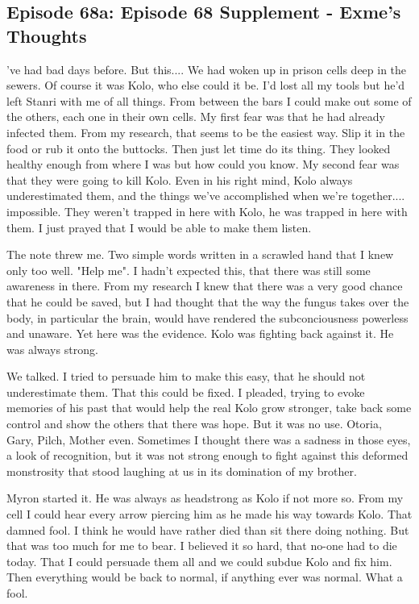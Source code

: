 \subsection{Episode 68a: Episode 68 Supplement - Exme's Thoughts}

've had bad days before. But this.... We had woken up in prison cells deep in the sewers. Of course it was Kolo, who else could it be. I'd lost all my tools but he'd left Stanri with me of all things. From between the bars I could make out some of the others, each one in their own cells. My first fear was that he had already infected them. From my research, that seems to be the easiest way. Slip it in the food or rub it onto the buttocks. Then just let time do its thing. They looked healthy enough from where I was but how could you know. My second fear was that they were going to kill Kolo. Even in his right mind, Kolo always underestimated them, and the things we've accomplished when we're together.... impossible. They weren't trapped in here with Kolo, he was trapped in here with them. I just prayed that I would be able to make them listen.\medskip

The note threw me. Two simple words written in a scrawled hand that I knew only too well. "Help me". I hadn't expected this, that there was still some awareness in there. From my research I knew that there was a very good chance that he could be saved, but I had thought that the way the fungus takes over the body, in particular the brain, would have rendered the subconciousness powerless and unaware. Yet here was the evidence. Kolo was fighting back against it. He was always strong.\medskip

We talked. I tried to persuade him to make this easy, that he should not underestimate them. That this could be fixed. I pleaded, trying to evoke memories of his past that would help the real Kolo grow stronger, take back some control and show the others that there was hope. But it was no use. Otoria, Gary, Pilch, Mother even. Sometimes I thought there was a sadness in those eyes, a look of recognition, but it was not strong enough to fight against this deformed monstrosity that stood laughing at us in its domination of my brother.\medskip

Myron started it. He was always as headstrong as Kolo if not more so. From my cell I could hear every arrow piercing him as he made his way towards Kolo. That damned fool. I think he would have rather died than sit there doing nothing. But that was too much for me to bear. I believed it so hard, that no-one had to die today. That I could persuade them all and we could subdue Kolo and fix him. Then everything would be back to normal, if anything ever was normal. What a fool.\medskip


